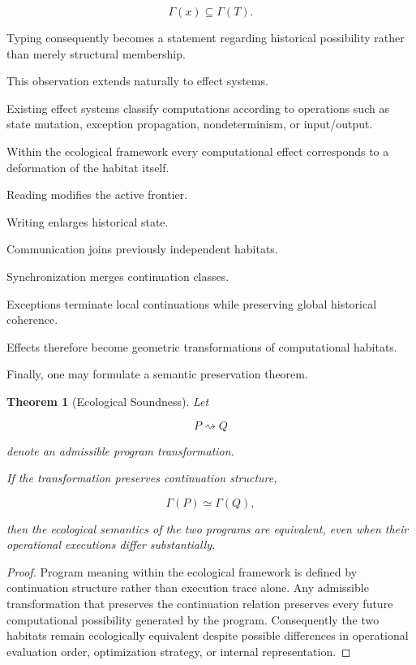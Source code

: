 \documentclass[12pt,oneside]{article}
\newtheorem{theorem}[definition]{Theorem}
\theoremstyle{remark}
\begin{document}
\[
\Gamma(x)
\subseteq
\Gamma(T).
\]

Typing consequently becomes a statement regarding historical possibility rather
than merely structural membership.

This observation extends naturally to effect systems.

Existing effect systems classify computations according to operations such as
state mutation, exception propagation, nondeterminism, or input/output.

Within the ecological framework every computational effect corresponds to a
deformation of the habitat itself.

Reading modifies the active frontier.

Writing enlarges historical state.

Communication joins previously independent habitats.

Synchronization merges continuation classes.

Exceptions terminate local continuations while preserving global historical
coherence.

Effects therefore become geometric transformations of computational habitats.

Finally, one may formulate a semantic preservation theorem.

\begin{theorem}[Ecological Soundness]

Let

\[
P
\rightsquigarrow
Q
\]

denote an admissible program transformation.

If the transformation preserves continuation structure,

\[
\Gamma(P)
\simeq
\Gamma(Q),
\]

then the ecological semantics of the two programs are equivalent, even when
their operational executions differ substantially.

\end{theorem}

\begin{proof}

Program meaning within the ecological framework is defined by continuation
structure rather than execution trace alone. Any admissible transformation that
preserves the continuation relation preserves every future computational
possibility generated by the program. Consequently the two habitats remain
ecologically equivalent despite possible differences in operational evaluation
order, optimization strategy, or internal representation.

\end{proof}
\end{document}
